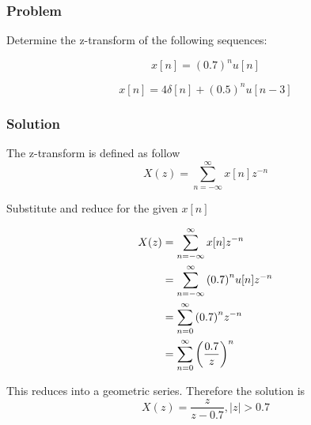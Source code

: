 \subsubsection{Problem}

Determine the z-transform of the following sequences:

\begin{equation}
x[n] = {\left( {0.7} \right)^n}u[n]
\end{equation}
    
\begin{equation}
x[n] = 4\delta [n] + {\left( {0.5} \right)^n}u[n - 3]
\end{equation}

\subsubsection{Solution}

The z-transform is defined as follow
\begin{equation}
X(z) = \sum\limits_{n =  - \infty }^\infty  {x[n]{z^{ - n}}} 
\end{equation}

Substitute and reduce for the given $x[n]$

\begin{equation}
\begin{aligned}
X(z) &= \sum\limits_{n =  - \infty }^\infty  {x[n]{z^{ - n}}}  \hfill \\
&= \sum\limits_{n =  - \infty }^\infty  {{{\left( {0.7} \right)}^n}u[n]{z^{ - n}}}  \hfill \\
&= \sum\limits_{n = 0}^\infty  {{{\left( {0.7} \right)}^n}{z^{ - n}}}  \hfill \\
&= {\sum\limits_{n = 0}^\infty  {\left( {\frac{{0.7}}{z}} \right)} ^{n}} \hfill \\ 
\end{aligned} 
\end{equation}

This reduces into a geometric series. Therefore the solution is
\begin{equation}
X(z) = \frac{z}{{z - 0.7}},\left| z \right| > 0.7
\end{equation}

